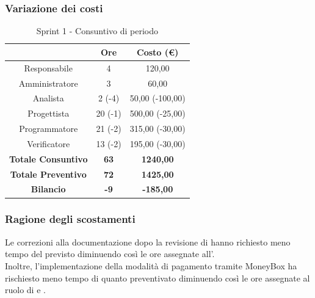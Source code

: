 \subsubsection{Variazione dei costi} \label{subsubsection:variazione_costi_sprint1}

\begin{table}[H]
  \centering
  \renewcommand{\arraystretch}{1.8}
  \begin{tabular}{c|c|c}
    \rowcolor[HTML]{125E28}
    \multicolumn{1}{c}{\color[HTML]{FFFFFF}\textbf{Ruolo}} &
    \multicolumn{1}{c}{\color[HTML]{FFFFFF}\textbf{Ore}}   &
    \multicolumn{1}{c}{\color[HTML]{FFFFFF}\textbf{Costo (€)}}                              \\
    \hline
    Responsabile                                           & 4           & 120,00           \\
    Amministratore                                         & 3           & 60,00            \\
    Analista                                               & 2 (-4)      & 50,00 (-100,00)  \\
    Progettista                                            & 20 (-1)     & 500,00 (-25,00)  \\
    Programmatore                                          & 21 (-2)     & 315,00 (-30,00)  \\
    Verificatore                                           & 13 (-2)     & 195,00 (-30,00)  \\
    \textbf{Totale Consuntivo}                             & \textbf{63} & \textbf{1240,00} \\
    \textbf{Totale Preventivo}                             & \textbf{72} & \textbf{1425,00} \\
    \textbf{Bilancio}                                      & \textbf{-9} & \textbf{-185,00} \\
  \end{tabular}
  \caption{Sprint 1 - Consuntivo di periodo}
\end{table}

\subsubsection{Ragione degli scostamenti} \label{subsubsection:ragione_scostamenti_sprint1}
Le correzioni alla documentazione dopo la revisione di \RTB{} hanno richiesto meno tempo del previsto diminuendo così le ore assegnate all'\roleAnalystLow{}.
\\Inoltre, l'implementazione della modalità di pagamento tramite MoneyBox\glo{} ha rischiesto meno tempo di quanto preventivato diminuendo così le ore assegnate al ruolo di \roleDesignerLow{} e \roleProgrammerLow{}.

